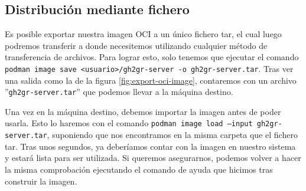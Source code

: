 \subsection{Distribución mediante fichero}
Es posible exportar nuestra imagen OCI a un único fichero tar, el cual luego podremos transferir a donde necesitemos utilizando cualquier método de transferencia de archivos. Para lograr esto, solo tenemos que ejecutar el comando \texttt{podman image save <usuario>/gh2gr-server -o gh2gr-server.tar}. Tras ver una salida como la de la figura \ref{fig:export-oci-image}, contaremos con un archivo ''{\tt gh2gr-server.tar}'' que podemos llevar a la máquina destino.

Una vez en la máquina destino, debemos importar la imagen antes de poder usarla. Esto lo haremos con el comando \texttt{podman image load --input gh2gr-server.tar}, suponiendo que nos encontramos en la misma carpeta que el fichero tar. Tras unos segundos, ya deberíamos contar con la imagen en nuestro sistema y estará lista para ser utilizada. Si queremos asegurarnos, podemos volver a hacer la misma comprobación ejecutando el comando de ayuda que hicimos tras construir la imagen.

